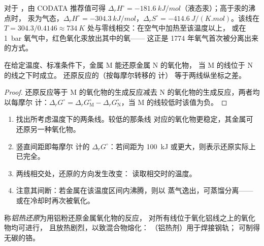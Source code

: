 \begin{example}[汞的氧化物]\label{ex:b2:ellingham:hgo}
对于 ，由 CODATA 推荐值可得 $\Delta_r H^\circ =
\qty{-181.6}{kJ/mol}$（液态汞）；高于汞的沸点时，
汞为气态，$\Delta_r H^\circ = \qty{-304.3}{kJ/mol}$，$\Delta_r
S^\circ = \qty{-414.6}{J/(K.mol)}$。该线在
$T = 304.3/0.4146 \approx \qty{734}{K}$ 处与零线相交：在空气中加热至该温度以上，
或在 \qty{1}{bar} 氧气中，红色氧化汞放出其中的氧——
这正是 1774 年氧气首次被分离出来的方式。
\end{example}

\begin{proposition}[何种金属还原何种氧化物]\label{prop:b2:ellingham:reduction}
在给定温度、标准条件下，金属 M 能还原金属 N 的氧化物，
当 M 的线位于 N 的线之下时成立。
还原反应的（按每摩尔转移的  计）
等于两线纵坐标之差。
\end{proposition}

\begin{proof}
还原反应等于 M 的氧化物的生成反应减去 N 的氧化物的生成反应，两者均
以每摩尔  计：$\Delta_r G^\circ = \Delta_r G^\circ_{\mathrm M} - \Delta_r
G^\circ_{\mathrm N}$，当 M 的线较低时该值为负。
\end{proof}

\begin{method}[读埃林厄姆图]\label{met:b2:ellingham:read-ellingham}
\begin{enumerate}
  \item 找出所考虑温度下的两条线。较低的那条线
        对应的氧化物更稳定，其金属可还原另一种氧化物。
  \item 竖直间距即每摩尔  计的 $\Delta_r G^\circ$：若间距为
        \qty{100}{kJ} 或更大，则表示还原实际上已完全。
  \item 两线相交处，还原的方向发生改变：
        读取相交时的温度。
  \item 注意其间断：若金属在该温度区间内沸腾，则以
        蒸气逸出，可蒸馏分离——或在冷却时再次被氧化。
\end{enumerate}
\end{method}

\begin{definition}[铝热还原]\label{def:b2:ellingham:aluminothermy}
称\emph{铝热还原}为用铝粉还原金属氧化物的反应，
对所有线位于氧化铝线之上的氧化物均可进行，
且放热剧烈，以致混合物熔化：
（铝热剂）用于焊接钢轨； 可制得无碳的铬。
\end{definition}

